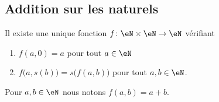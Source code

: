 \subsection{Addition sur les naturels}

\begin{propositionDef}      \label{PROPooVFOXooXmwpFh}
	Il existe une unique fonction \( f\colon \eN\times \eN\to \eN\) vérifiant
	\begin{enumerate}
		\item       \label{ITEMooILZSooNYIkYR}
		      \( f(a,0)=a\) pour tout \( a\in \eN\)
		\item       \label{ITEMooZWHQooBAjZyE}
		      \( f\big( a,s(b) \big)=s\big( f(a,b) \big)\) pour tout \( a,b\in \eN\).
	\end{enumerate}
	Pour \( a,b\in \eN\) nous notons \( f(a,b)=a+b\).
\end{propositionDef}

